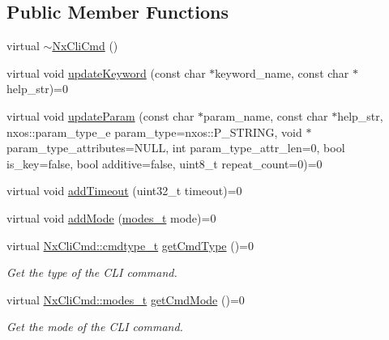 \subsection*{Public Member Functions}
\begin{DoxyCompactItemize}
\item 
virtual \mbox{\hyperlink{classnxos_1_1_nx_cli_cmd_a3678e859df1bd42824f5b9f9f1de3b08}{$\sim$\+Nx\+Cli\+Cmd}} ()
\item 
virtual void \mbox{\hyperlink{classnxos_1_1_nx_cli_cmd_aa698fdd1026739307e0710e2948f19f5}{update\+Keyword}} (const char $\ast$keyword\+\_\+name, const char $\ast$help\+\_\+str)=0
\item 
virtual void \mbox{\hyperlink{classnxos_1_1_nx_cli_cmd_abc9244b0bcf22142b5d784c06a6aa91b}{update\+Param}} (const char $\ast$param\+\_\+name, const char $\ast$help\+\_\+str, nxos\+::param\+\_\+type\+\_\+e param\+\_\+type=nxos\+::\+P\+\_\+\+S\+T\+R\+I\+NG, void $\ast$param\+\_\+type\+\_\+attributes=N\+U\+LL, int param\+\_\+type\+\_\+attr\+\_\+len=0, bool is\+\_\+key=false, bool additive=false, uint8\+\_\+t repeat\+\_\+count=0)=0
\item 
virtual void \mbox{\hyperlink{classnxos_1_1_nx_cli_cmd_ad4ebfd3ce0e68266bbc22bb4bc7dad0b}{add\+Timeout}} (uint32\+\_\+t timeout)=0
\item 
virtual void \mbox{\hyperlink{classnxos_1_1_nx_cli_cmd_a38260da2d6b7a227c4dd027521205c0b}{add\+Mode}} (\mbox{\hyperlink{classnxos_1_1_nx_cli_cmd_a72999b2e8f2995bbb19be346d875e3ce}{modes\+\_\+t}} mode)=0
\item 
\mbox{\label{classnxos_1_1_nx_cli_cmd_ab9dce490e4854f1160ba08fdc646bd37}} 
virtual \mbox{\hyperlink{classnxos_1_1_nx_cli_cmd_a82ed104f13c7859b24d3c0527f706be1}{Nx\+Cli\+Cmd\+::cmdtype\+\_\+t}} \mbox{\hyperlink{classnxos_1_1_nx_cli_cmd_ab9dce490e4854f1160ba08fdc646bd37}{get\+Cmd\+Type}} ()=0
\begin{DoxyCompactList}\small\item\em Get the type of the C\+LI command. \end{DoxyCompactList}\item 
\mbox{\label{classnxos_1_1_nx_cli_cmd_a8ac3fe47522ba60987babb8c830153ff}} 
virtual \mbox{\hyperlink{classnxos_1_1_nx_cli_cmd_a72999b2e8f2995bbb19be346d875e3ce}{Nx\+Cli\+Cmd\+::modes\+\_\+t}} \mbox{\hyperlink{classnxos_1_1_nx_cli_cmd_a8ac3fe47522ba60987babb8c830153ff}{get\+Cmd\+Mode}} ()=0
\begin{DoxyCompactList}\small\item\em Get the mode of the C\+LI command. \end{DoxyCompactList}\item 

\end{DoxyCompactItemize}

